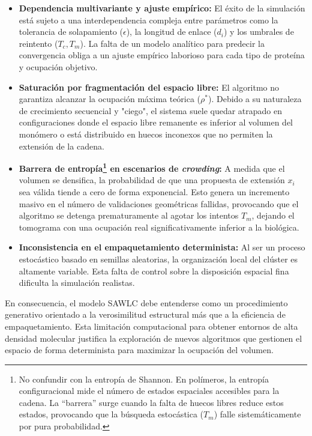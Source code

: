 \begin{itemize}
    \item \textbf{Dependencia multivariante y ajuste empírico:} El éxito de la simulación está sujeto a una interdependencia compleja entre parámetros como la tolerancia de solapamiento ($\epsilon$), la longitud de enlace ($d_i$) y los umbrales de reintento ($T_c, T_m$). La falta de un modelo analítico para predecir la convergencia obliga a un ajuste empírico laborioso para cada tipo de proteína y ocupación objetivo.
    
    \item \textbf{Saturación por fragmentación del espacio libre:} El algoritmo no garantiza alcanzar la ocupación máxima teórica ($\rho^*$). Debido a su naturaleza de crecimiento secuencial y "ciego", el sistema suele quedar atrapado en configuraciones donde el espacio libre remanente es inferior al volumen del monómero o está distribuido en huecos inconexos que no permiten la extensión de la cadena.
    
    \item \textbf{Barrera de {entropía}\footnote{No confundir con la entropía de Shannon. En polímeros, la entropía configuracional mide el número de estados espaciales accesibles para la cadena. La ``barrera'' surge cuando la falta de huecos libres reduce estos estados, provocando que la búsqueda estocástica ($T_m$) falle sistemáticamente por pura probabilidad.} en escenarios de \textit{crowding}:} A medida que el volumen se densifica, la probabilidad de que una propuesta de extensión $x_i$ sea válida tiende a cero de forma exponencial. Esto genera un incremento masivo en el número de validaciones geométricas fallidas, provocando que el algoritmo se detenga prematuramente al agotar los intentos $T_m$, dejando el tomograma con una ocupación real significativamente inferior a la biológica.
    
    \item \textbf{Inconsistencia en el empaquetamiento determinista:} Al ser un proceso estocástico basado en semillas aleatorias, la organización local del clúster es altamente variable. Esta falta de control sobre la disposición espacial fina dificulta la simulación realistas.
\end{itemize}

En consecuencia, el modelo SAWLC debe entenderse como un procedimiento generativo orientado a la verosimilitud estructural más que a la eficiencia de empaquetamiento. Esta limitación computacional para obtener entornos de alta densidad molecular justifica la exploración de nuevos algoritmos que gestionen el espacio de forma determinista para maximizar la ocupación del volumen.

